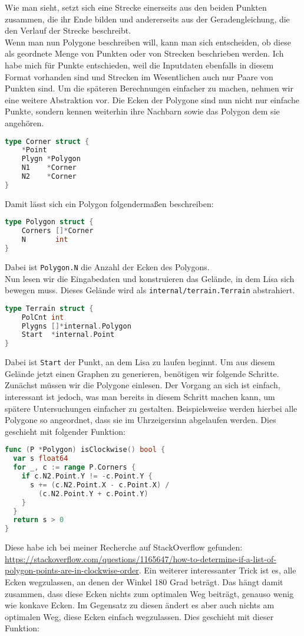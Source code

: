 \documentclass[a4paper,10pt,ngerman]{scrartcl}
\begin{document}
Wie man sieht, setzt sich eine Strecke einerseits aus den beiden Punkten zusammen, die ihr Ende bilden und andererseits aus der Geradengleichung, die den Verlauf der Strecke beschreibt.\\
Wenn man nun Polygone beschreiben will, kann man sich entscheiden, ob diese als geordnete Menge von Punkten oder von Strecken beschrieben werden. Ich habe mich für Punkte entschieden, weil die Inputdaten ebenfalls in diesem Format vorhanden sind und Strecken im Wesentlichen auch nur Paare von Punkten sind. Um die späteren Berechnungen einfacher zu machen, nehmen wir eine weitere Abstraktion vor. Die Ecken der Polygone sind nun nicht nur einfache Punkte, sondern kennen weiterhin ihre Nachbarn sowie das Polygon dem sie angehören.
\begin{lstlisting}[language=go]
type Corner struct {
	*Point
	Plygn *Polygon
	N1    *Corner
	N2    *Corner
} 
\end{lstlisting}
Damit lässt sich ein Polygon folgenderma\ss en beschreiben:
\begin{lstlisting}[language=go]
type Polygon struct {
	Corners []*Corner
	N       int
}
\end{lstlisting}
Dabei ist \texttt{Polygon.N} die Anzahl der Ecken des Polygons.\\
Nun lesen wir die Eingabedaten und konstruieren das Gelände, in dem Lisa sich bewegen muss. Dieses Gelände wird als \texttt{internal/terrain.Terrain} abstrahiert.
\begin{lstlisting}[language=go]
type Terrain struct {
	PolCnt int
	Plygns []*internal.Polygon
	Start  *internal.Point
}
\end{lstlisting}
Dabei ist \texttt{Start} der Punkt, an dem Lisa zu laufen beginnt. Um aus diesem Gelände jetzt einen Graphen zu generieren, benötigen wir folgende Schritte.\\
Zunächst müssen wir die Polygone einlesen. Der Vorgang an sich ist einfach, interessant ist jedoch, was man bereits in diesem Schritt machen kann, um spätere Untersuchungen einfacher zu gestalten. Beispielsweise werden hierbei alle Polygone so angeordnet, dass sie im Uhrzeigersinn abgelaufen werden. Dies geschieht mit folgender Funktion:
\begin{lstlisting}[language=go]
func (P *Polygon) isClockwise() bool {
  var s float64
  for _, c := range P.Corners {
    if c.N2.Point.Y != -c.Point.Y {
      s += (c.N2.Point.X - c.Point.X) /
        (c.N2.Point.Y + c.Point.Y)
    }
  }
  return s > 0
}
\end{lstlisting} 
Diese habe ich bei meiner Recherche auf StackOverflow gefunden: \url{https://stackoverflow.com/questions/1165647/how-to-determine-if-a-list-of-polygon-points-are-in-clockwise-order}. Ein weiterer interessanter Trick ist es, alle Ecken wegzulassen, an denen der Winkel 180 Grad beträgt. Das hängt damit zusammen, dass diese Ecken nichts zum optimalen Weg beiträgt, genauso wenig wie konkave Ecken. Im Gegensatz zu diesen ändert es aber auch nichts am optimalen Weg, diese Ecken einfach wegzulassen. Dies geschieht mit dieser Funktion:
\end{document}
